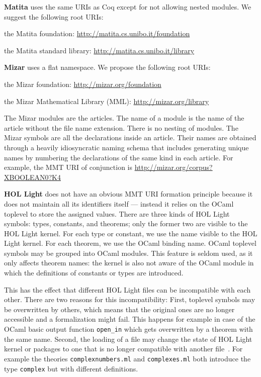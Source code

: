 \textbf{Matita} uses the same URIs as Coq except for not allowing nested modules.
We suggest the following root URIs:
\begin{compactitem}
\item the Matita foundation: \url{http://matita.cs.unibo.it/foundation}
\item the Matita standard library: \url{http://matita.cs.unibo.it/library}
\end{compactitem}
\medskip

\textbf{Mizar} uses a flat namespace.
We propose the following root URIs:
\begin{compactitem}
 \item the Mizar foundation: \url{http://mizar.org/foundation}
 \item the Mizar Mathematical Library (MML): \url{http://mizar.org/library}
\end{compactitem}

The Mizar modules are the articles.
The name of a module is the name of the article without the file name extension.
There is no nesting of modules.
%
The Mizar symbols are all the declarations inside an article.
Their names are obtained through a heavily idiosyncratic naming schema that includes generating unique names by numbering the declarations of the same kind in each article.
For example, the MMT URI of conjunction is
\url{http://mizar.org/corpus?XBOOLEAN0?K4}
\medskip

\textbf{HOL Light} does not have an obvious MMT URI formation principle because it does not maintain all its identifiers itself --- instead it relies on the OCaml toplevel to store the assigned values.
There are three kinds of HOL Light symbols: types, constants, and theorems; only the former two are visible to the HOL Light kernel.
For each type or constant, we use the name visible to the HOL Light kernel.
For each theorem, we use the OCaml binding name.
OCaml toplevel symbols may be grouped into OCaml modules. This feature is seldom used, as it only affects theorem names: the kernel is also not aware of the OCaml module in which the definitions of constants or types are introduced.

This has the effect that different HOL Light files can be incompatible with each other.
There are two reasons for this incompatibility: First, toplevel symbols may be overwritten by others, which means that the original ones are
no longer accessible and a formalization might fail.
This happens for example in case of the OCaml basic output function \texttt{open\_in}
which gets overwritten by a theorem with the same name.
Second, the loading of a file may change the state of HOL Light kernel or packages to one that is no longer compatible
with another file~\cite{wiedijk-types09}. For example the theories \texttt{complexnumbers.ml}
and \texttt{complexes.ml} both introduce the type \texttt{complex} but with different
definitions.


